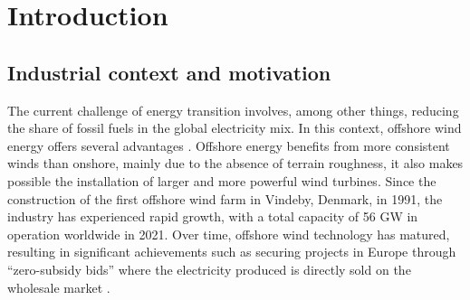 \cleardoublepage
\chapter*{Introduction}


\section*{Industrial context and motivation}

The current challenge of energy transition involves, among other things, reducing the share of fossil fuels in the global electricity mix. 
In this context, offshore wind energy offers several advantages \citep{eolien_en_mer_2022}. 
Offshore energy benefits from more consistent winds than onshore, mainly due to the absence of terrain roughness, it also makes possible the installation of larger and more powerful wind turbines. 
Since the construction of the first offshore wind farm in Vindeby, Denmark, in 1991, the industry has experienced rapid growth, with a total capacity of 56 GW in operation worldwide in 2021. 
Over time, offshore wind technology has matured, resulting in significant achievements such as securing projects in Europe through ``zero-subsidy bids'' where the electricity produced is directly sold on the wholesale market \citep{eolien_en_mer_2022}. 

